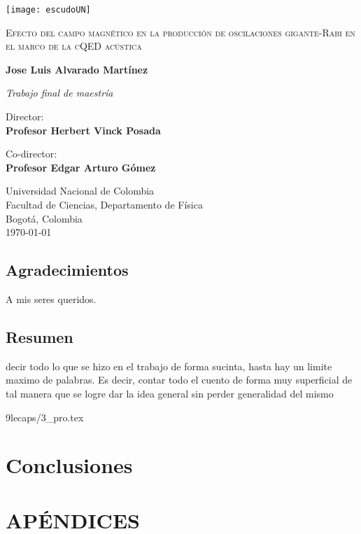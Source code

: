 \documentclass[12pt,a4paper,oneside,parskip=half]{scrbook}
\begin{document}
\frontmatter
%
\begin{titlepage}
\centering
\texttt{[image: escudoUN]}\par
\vspace{1cm}
{\scshape \Huge Efecto del campo magnético en la producción de oscilaciones gigante-Rabi en el marco de la cQED acústica \par}
\vfill
{\Large \textbf{Jose Luis Alvarado Martínez} \par}
\vfill
{\large \textit{Trabajo final de maestr\'ia} \par}
\vfill
{\large Director:\\ \textbf{Profesor Herbert Vinck Posada} \par}
\vfill
{\large Co-director:\\ \textbf{Profesor Edgar Arturo Gómez} \par}
\vfill
{\large Universidad Nacional de Colombia\\
	Facultad de Ciencias, Departamento de F\'isica\\
	Bogot\'a, Colombia\\
	\today \par}
\end{titlepage}
%
\section*{Agradecimientos}
A mis seres queridos.
%
\newpage
%
\section*{Resumen}
decir todo lo que se hizo en el trabajo de forma sucinta, hasta hay un limite maximo de palabras. Es decir, contar todo el cuento de forma muy superficial de tal manera que se logre dar la idea general sin perder generalidad del mismo
%
\tableofcontents
\listoffigures
%
\mainmatter
%


\subfi9le{caps/3_pro.tex}






\chapter*{Conclusiones}

%
\appendix
\chapter*{\textsc{AP\'ENDICES}}

\backmatter
%
\printbibliography[heading=subbibliography]
%
\end{document}
